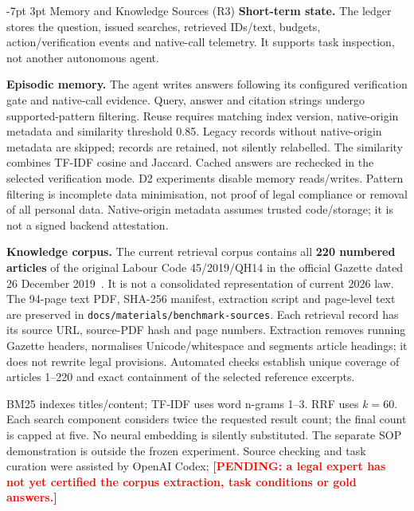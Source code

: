 \documentclass[a4paper,11pt]{article}
\makeatletter
\renewcommand\section{\@startsection{section}{1}{\z@}%
                                   {-7pt \@plus -1pt \@minus -1pt}%
                                   {3pt \@plus 1pt \@minus 1pt}%
                                   {\normalfont\large\bfseries}}
\newcommand{\hdr}[1]{\vspace{2pt}\noindent\textbf{#1}}
\newcommand{\pending}[1]{\textcolor{red}{\textbf{[PENDING: #1]}}}
\newcommand{\code}[1]{\nolinkurl{#1}}
\makeatother
\begin{document}
\section{Memory and Knowledge Sources (R3)}
\hdr{Short-term state.} The ledger stores the question, issued searches, retrieved IDs/text, budgets, action/verification events and native-call telemetry. It supports task inspection, not another autonomous agent.

\hdr{Episodic memory.} The agent writes answers following its configured verification gate and native-call evidence. Query, answer and citation strings undergo supported-pattern filtering. Reuse requires matching index version, native-origin metadata and similarity threshold 0.85. Legacy records without native-origin metadata are skipped; records are retained, not silently relabelled. The similarity combines TF-IDF cosine and Jaccard. Cached answers are rechecked in the selected verification mode. D2 experiments disable memory reads/writes. Pattern filtering is incomplete data minimisation, not proof of legal compliance or removal of all personal data. Native-origin metadata assumes trusted code/storage; it is not a signed backend attestation.

\hdr{Knowledge corpus.} The current retrieval corpus contains all \textbf{220 numbered articles} of the original Labour Code 45/2019/QH14 in the official Gazette dated 26 December 2019~\citep{bll2019gazette}. It is not a consolidated representation of current 2026 law. The 94-page text PDF, SHA-256 manifest, extraction script and page-level text are preserved in \code{docs/materials/benchmark-sources}. Each retrieval record has its source URL, source-PDF hash and page numbers. Extraction removes running Gazette headers, normalises Unicode/whitespace and segments article headings; it does not rewrite legal provisions. Automated checks establish unique coverage of articles 1--220 and exact containment of the selected reference excerpts.

BM25 indexes titles/content; TF-IDF uses word n-grams 1--3. RRF uses $k=60$. Each search component considers twice the requested result count; the final count is capped at five. No neural embedding is silently substituted. The separate SOP demonstration is outside the frozen experiment. Source checking and task curation were assisted by OpenAI Codex; \pending{a legal expert has not yet certified the corpus extraction, task conditions or gold answers.}

\clearpage
\end{document}
